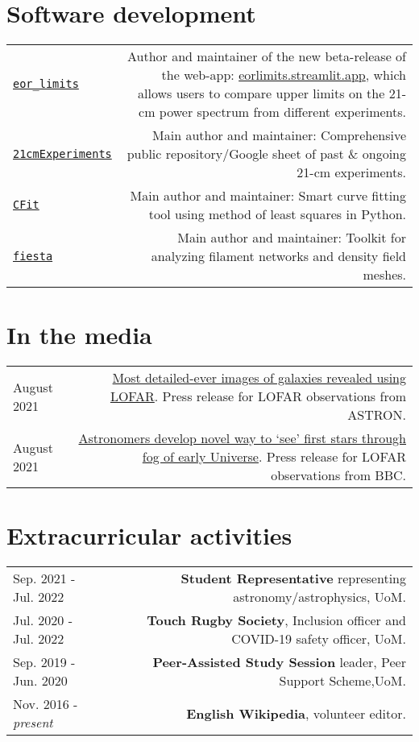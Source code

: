\documentclass{article}
\begin{document}
\section*{Software development}

\begin{longtable}{L!{\vrule}R}
  \href{https://github.com/JitenDhandha/eor_limits}{\texttt{eor\_limits}} & Author and maintainer of the new beta-release of the web-app: \href{https://eorlimits.streamlit.app/}{eorlimits.streamlit.app}, which allows users to compare upper limits on the 21-cm power spectrum from different experiments. \\
  \href{https://github.com/JitenDhandha/21cmExperiments}{\texttt{21cmExperiments}} & Main author and maintainer: Comprehensive public repository/Google sheet of past \& ongoing 21-cm experiments. \\
	\href{https://github.com/JitenDhandha/CFit}{\texttt{CFit}} & Main author and maintainer: Smart curve fitting tool using method of least squares in Python.\\
	\href{https://fiesta-astro.readthedocs.io}{\texttt{fiesta}} & Main author and maintainer: Toolkit for analyzing filament networks and density field meshes. \\
\end{longtable}

\section*{In the media}

\begin{longtable}{L!{\vrule}R}
	August 2021 & \href{https://www.astron.nl/most-detailed-ever-images-of-galaxies-revealed-using-lofar }{Most detailed-ever images of galaxies revealed using LOFAR}. Press release for LOFAR observations from ASTRON. \\
	August 2021 & \href{https://www.bbc.co.uk/news/science-environment-57998940}{Astronomers develop novel way to `see' first stars through fog of early Universe}. Press release for LOFAR observations from BBC. \\
\end{longtable}

\section*{Extracurricular activities}
\begin{longtable}{L!{\vrule}R}

  Sep. 2021 - Jul. 2022 & \textbf{Student Representative} representing astronomy/astrophysics, UoM. \\

  Jul. 2020 - Jul. 2022 & \textbf{Touch Rugby Society}, Inclusion officer and COVID-19 safety officer, UoM. \\

	Sep. 2019 - Jun. 2020 & \textbf{Peer-Assisted Study Session} leader, Peer Support Scheme,UoM. \\

	Nov. 2016 - \textit{present} & \textbf{English Wikipedia}, volunteer editor. \\
\end{longtable}
\end{document}
